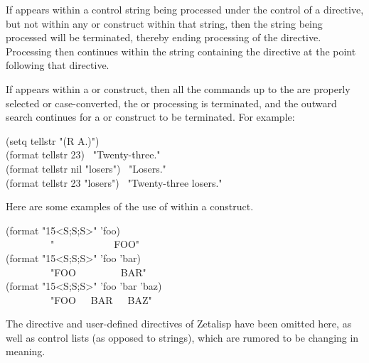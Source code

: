 \begin{flushdesc}
If \cd{{\Xtilde}{\Xcircumflex}} appears within a control string being processed
under the control of a  directive, but not within
any \cd{{\Xtilde}{\Xlbrace}} or \cd{{\Xtilde}<} construct within that string,
then the string being
processed will be terminated, thereby ending processing
of the  directive.  Processing then
continues within the string
containing the  directive at the point following that directive.

If \cd{{\Xtilde}{\Xcircumflex}} appears within a \cd{{\Xtilde}{\Xlbracket}} or \cd{{\Xtilde}(} construct,
then all the commands up to the \cd{{\Xtilde}{\Xcircumflex}} are properly selected
or case-converted, the \cd{{\Xtilde}{\Xlbracket}} or \cd{{\Xtilde}(} processing is terminated,
and the outward search continues for a \cd{{\Xtilde}{\Xlbrace}} or \cd{{\Xtilde}<} construct
to be terminated.  For example:
\begin{lisp}
(setq tellstr "{\Xtilde}{\Xatsign}({\Xtilde}{\Xatsign}{\Xlbracket}{\Xtilde}R{\Xtilde}{\Xrbracket}{\Xtilde}{\Xcircumflex} {\Xtilde}A.{\Xtilde})") \\
(format {\false} tellstr 23) \EV\ "Twenty-three." \\
(format {\false} tellstr nil "losers") \EV\ "Losers." \\
(format {\false} tellstr 23 "losers") \EV\ "Twenty-three losers."
\end{lisp}

Here are some examples of the use of \cd{{\Xtilde}{\Xcircumflex}} within a \cd{{\Xtilde}<} construct.
\begin{lisp}
(format {\false} "{\Xtilde}15<{\Xtilde}S{\Xtilde};{\Xtilde}{\Xcircumflex}{\Xtilde}S{\Xtilde};{\Xtilde}{\Xcircumflex}{\Xtilde}S{\Xtilde}>" 'foo) \\
~~~~~~~~\EV\  "~~~~~~~~~~~~FOO" \\
(format {\false} "{\Xtilde}15<{\Xtilde}S{\Xtilde};{\Xtilde}{\Xcircumflex}{\Xtilde}S{\Xtilde};{\Xtilde}{\Xcircumflex}{\Xtilde}S{\Xtilde}>" 'foo 'bar) \\
~~~~~~~~\EV\  "FOO~~~~~~~~~BAR" \\
(format {\false} "{\Xtilde}15<{\Xtilde}S{\Xtilde};{\Xtilde}{\Xcircumflex}{\Xtilde}S{\Xtilde};{\Xtilde}{\Xcircumflex}{\Xtilde}S{\Xtilde}>" 'foo 'bar 'baz) \\
~~~~~~~~\EV\  "FOO~~~BAR~~~BAZ"
\end{lisp}
\end{flushdesc}

\begin{obsolete}
\beforenoterule
\begin{incompatibility}
The  directive and user-defined directives of Zetalisp have been
omitted here, as well as control lists (as opposed to strings),
which are rumored to be changing in meaning.
\end{incompatibility}
\afternoterule
\end{obsolete}

